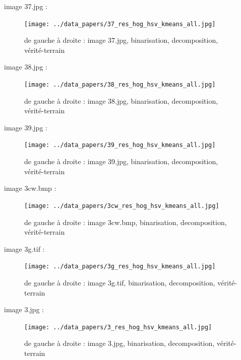 \documentclass{book}
\begin{document}
image 37.jpg : 
\begin{figure}[H]
\begin{center}
\texttt{[image: ../data\_papers/37\_res\_hog\_hsv\_kmeans\_all.jpg]}
\end{center}
\caption{de gauche à droite : image 37.jpg, binarisation, decomposition, vérité-terrain}
\label{37}
\end{figure}
\clearpage


image 38.jpg : 
\begin{figure}[H]
\begin{center}
\texttt{[image: ../data\_papers/38\_res\_hog\_hsv\_kmeans\_all.jpg]}
\end{center}
\caption{de gauche à droite : image 38.jpg, binarisation, decomposition, vérité-terrain}
\label{38}
\end{figure}
\clearpage


image 39.jpg : 
\begin{figure}[H]
\begin{center}
\texttt{[image: ../data\_papers/39\_res\_hog\_hsv\_kmeans\_all.jpg]}
\end{center}
\caption{de gauche à droite : image 39.jpg, binarisation, decomposition, vérité-terrain}
\label{39}
\end{figure}
\clearpage


image 3cw.bmp : 
\begin{figure}[H]
\begin{center}
\texttt{[image: ../data\_papers/3cw\_res\_hog\_hsv\_kmeans\_all.jpg]}
\end{center}
\caption{de gauche à droite : image 3cw.bmp, binarisation, decomposition, vérité-terrain}
\label{3cw}
\end{figure}
\clearpage


image 3g.tif : 
\begin{figure}[H]
\begin{center}
\texttt{[image: ../data\_papers/3g\_res\_hog\_hsv\_kmeans\_all.jpg]}
\end{center}
\caption{de gauche à droite : image 3g.tif, binarisation, decomposition, vérité-terrain}
\label{3g}
\end{figure}
\clearpage


image 3.jpg : 
\begin{figure}[H]
\begin{center}
\texttt{[image: ../data\_papers/3\_res\_hog\_hsv\_kmeans\_all.jpg]}
\end{center}
\caption{de gauche à droite : image 3.jpg, binarisation, decomposition, vérité-terrain}
\label{3}
\end{figure}
\clearpage
\end{document}
